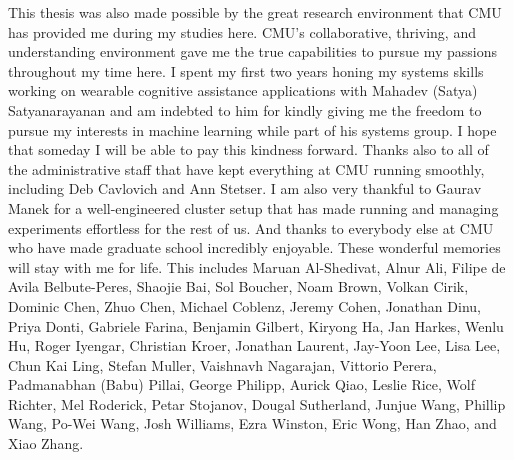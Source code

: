 \documentclass[12pt,masters]{cmuthesis}
\begin{document}
\begin{acknowledgments}
    This thesis was also made possible by the great research
    environment that CMU has provided me during my studies here.
    CMU's collaborative, thriving, and understanding environment gave
    me the true capabilities to pursue my passions throughout my time here.
    I spent my first two years honing my systems skills working on
    wearable cognitive assistance applications with
    Mahadev (Satya) Satyanarayanan and am
    indebted to him for kindly giving me the freedom to pursue my
    interests in machine learning while part of his systems group.
    I hope that someday I will be able to pay this kindness forward.
    Thanks also to all of the administrative staff that have
    kept everything at CMU running smoothly, including
    Deb Cavlovich and Ann Stetser.
    I am also very thankful to Gaurav Manek for a well-engineered
    cluster setup that has made running and managing
    experiments effortless for the rest of us.
    And thanks to everybody else at CMU who have made
    graduate school incredibly enjoyable.
    These wonderful memories will stay with me for life.
    This includes
    Maruan Al-Shedivat,
    Alnur Ali,
    Filipe de Avila Belbute-Peres,
    Shaojie Bai,
    Sol Boucher,
    Noam Brown,
    Volkan Cirik,
    Dominic Chen,
    Zhuo Chen,
    Michael Coblenz,
    Jeremy Cohen,
    Jonathan Dinu,
    Priya Donti,
    Gabriele Farina,
    Benjamin Gilbert,
    Kiryong Ha,
    Jan Harkes,
    Wenlu Hu,
    Roger Iyengar,
    Christian Kroer,
    Jonathan Laurent,
    Jay-Yoon Lee,
    Lisa Lee,
    Chun Kai Ling,
    Stefan Muller,
    Vaishnavh Nagarajan,
    Vittorio Perera,
    Padmanabhan (Babu) Pillai,
    George Philipp,
    Aurick Qiao,
    Leslie Rice,
    Wolf Richter,
    Mel Roderick,
    Petar Stojanov,
    Dougal Sutherland,
    Junjue Wang,
    Phillip Wang,
    Po-Wei Wang,
    Josh Williams,
    Ezra Winston,
    Eric Wong,
    Han Zhao, and
    Xiao Zhang.


\end{acknowledgments}
\end{document}
